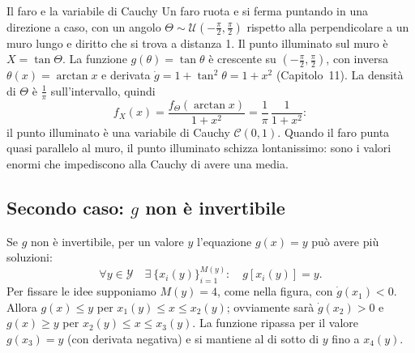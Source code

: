 \begin{esempio}{Il faro e la variabile di Cauchy}
Un faro ruota e si ferma puntando in una direzione a caso, con un angolo $\Theta \sim \mathcal{U}\left(-\frac{\pi}{2},
\frac{\pi}{2}\right)$ rispetto alla perpendicolare a un muro lungo e diritto che si trova a distanza 1. Il punto
illuminato sul muro è $X = \tan\Theta$. La funzione $g(\theta) = \tan\theta$ è crescente su
$\left(-\frac{\pi}{2}, \frac{\pi}{2}\right)$, con inversa $\theta(x) = \arctan x$ e derivata
$\dot g = 1 + \tan^2\theta = 1 + x^2$ (Capitolo~11). La densità di $\Theta$ è $\frac1\pi$ sull'intervallo, quindi
\[ f_X(x) = \frac{f_\Theta(\arctan x)}{1 + x^2} = \frac{1}{\pi}\, \frac{1}{1 + x^2} : \]
il punto illuminato è una variabile di Cauchy $\mathcal{C}(0, 1)$. Quando il faro punta quasi parallelo al muro, il
punto illuminato schizza lontanissimo: sono i valori enormi che impediscono alla Cauchy di avere una media.
\begin{center}
\end{center}
\end{esempio}

\subsection{Secondo caso: \texorpdfstring{$g$}{g} non è invertibile}

Se $g$ non è invertibile, per un valore $y$ l'equazione $g(x) = y$ può avere più soluzioni:
\[ \forall y \in \mathcal{Y} \quad \exists\ \{x_i(y)\}_{i=1}^{M(y)} : \quad g[x_i(y)] = y . \]
Per fissare le idee supponiamo $M(y) = 4$, come nella figura, con $\dot g(x_1) < 0$. Allora $g(x) \leq y$ per
$x_1(y) \leq x \leq x_2(y)$; ovviamente sarà $\dot g(x_2) > 0$ e $g(x) \geq y$ per $x_2(y) \leq x \leq x_3(y)$. La
funzione ripassa per il valore $g(x_3) = y$ (con derivata negativa) e si mantiene al di sotto di $y$ fino a $x_4(y)$.

